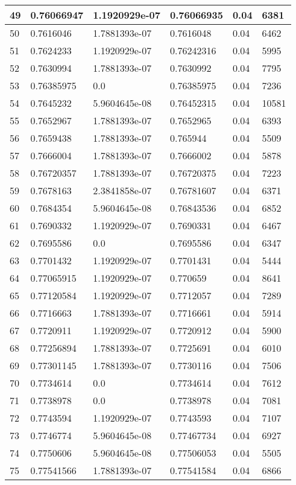\begin{longtable}{|l|l|l|l|l|l|}
49 & 0.76066947 & 1.1920929e-07 & 0.76066935 & 0.04 & 6381 \\ \hline 
50 & 0.7616046 & 1.7881393e-07 & 0.7616048 & 0.04 & 6462 \\ \hline 
51 & 0.7624233 & 1.1920929e-07 & 0.76242316 & 0.04 & 5995 \\ \hline 
52 & 0.7630994 & 1.7881393e-07 & 0.7630992 & 0.04 & 7795 \\ \hline 
53 & 0.76385975 & 0.0 & 0.76385975 & 0.04 & 7236 \\ \hline 
54 & 0.7645232 & 5.9604645e-08 & 0.76452315 & 0.04 & 10581 \\ \hline 
55 & 0.7652967 & 1.7881393e-07 & 0.7652965 & 0.04 & 6393 \\ \hline 
56 & 0.7659438 & 1.7881393e-07 & 0.765944 & 0.04 & 5509 \\ \hline 
57 & 0.7666004 & 1.7881393e-07 & 0.7666002 & 0.04 & 5878 \\ \hline 
58 & 0.76720357 & 1.7881393e-07 & 0.76720375 & 0.04 & 7223 \\ \hline 
59 & 0.7678163 & 2.3841858e-07 & 0.76781607 & 0.04 & 6371 \\ \hline 
60 & 0.7684354 & 5.9604645e-08 & 0.76843536 & 0.04 & 6852 \\ \hline 
61 & 0.7690332 & 1.1920929e-07 & 0.7690331 & 0.04 & 6467 \\ \hline 
62 & 0.7695586 & 0.0 & 0.7695586 & 0.04 & 6347 \\ \hline 
63 & 0.7701432 & 1.1920929e-07 & 0.7701431 & 0.04 & 5444 \\ \hline 
64 & 0.77065915 & 1.1920929e-07 & 0.770659 & 0.04 & 8641 \\ \hline 
65 & 0.77120584 & 1.1920929e-07 & 0.7712057 & 0.04 & 7289 \\ \hline 
66 & 0.7716663 & 1.7881393e-07 & 0.7716661 & 0.04 & 5914 \\ \hline 
67 & 0.7720911 & 1.1920929e-07 & 0.7720912 & 0.04 & 5900 \\ \hline 
68 & 0.77256894 & 1.7881393e-07 & 0.7725691 & 0.04 & 6010 \\ \hline 
69 & 0.77301145 & 1.7881393e-07 & 0.7730116 & 0.04 & 7506 \\ \hline 
70 & 0.7734614 & 0.0 & 0.7734614 & 0.04 & 7612 \\ \hline 
71 & 0.7738978 & 0.0 & 0.7738978 & 0.04 & 7081 \\ \hline 
72 & 0.7743594 & 1.1920929e-07 & 0.7743593 & 0.04 & 7107 \\ \hline 
73 & 0.7746774 & 5.9604645e-08 & 0.77467734 & 0.04 & 6927 \\ \hline 
74 & 0.7750606 & 5.9604645e-08 & 0.77506053 & 0.04 & 5505 \\ \hline 
75 & 0.77541566 & 1.7881393e-07 & 0.77541584 & 0.04 & 6866 \\ \hline 
\end{longtable}